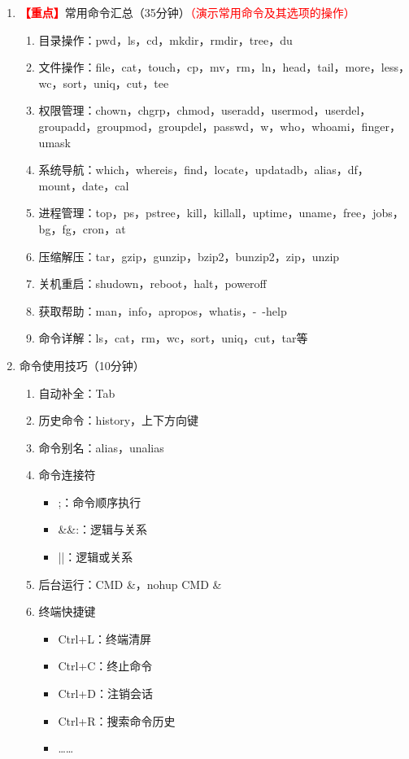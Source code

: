 \documentclass{TIJMUjiaoanLL}
\begin{document}
\begin{enumerate}
  \item \textcolor{red}{\textbf{【重点】}}常用命令汇总（35分钟）\textcolor{red}{（演示常用命令及其选项的操作）}
    \begin{enumerate}
      \item 目录操作：pwd，ls，cd，mkdir，rmdir，tree，du
      \item 文件操作：file，cat，touch，cp，mv，rm，ln，head，tail，more，less，wc，sort，uniq，cut，tee
      \item 权限管理：chown，chgrp，chmod，useradd，usermod，userdel，groupadd，groupmod，groupdel，passwd，w，who，whoami，finger，umask
      \item 系统导航：which，whereis，find，locate，updatadb，alias，df，mount，date，cal
      \item 进程管理：top，ps，pstree，kill，killall，uptime，uname，free，jobs，bg，fg，cron，at
      \item 压缩解压：tar，gzip，gunzip，bzip2，bunzip2，zip，unzip
      \item 关机重启：shudown，reboot，halt，poweroff
      \item 获取帮助：man，info，apropos，whatis，-\ -help
      \item 命令详解：ls，cat，rm，wc，sort，uniq，cut，tar等
    \end{enumerate}

  \item 命令使用技巧（10分钟）
    \vspace*{-10pt}
    \begin{multicols}{2}
    \begin{enumerate}
      \item 自动补全：Tab
      \item 历史命令：history，上下方向键
      \item 命令别名：alias，unalias
      \item 命令连接符
	\begin{itemize}
	  \item ;：命令顺序执行
	  \item \&\&:：逻辑与关系
	  \item ||：逻辑或关系
	\end{itemize}
      \item 后台运行：CMD \&，nohup CMD \&
      \item 终端快捷键
	\begin{itemize}
	  \item Ctrl+L：终端清屏
	  \item Ctrl+C：终止命令
	  \item Ctrl+D：注销会话
	  \item Ctrl+R：搜索命令历史
	  \item ……
	\end{itemize}
    \end{enumerate}
    \end{multicols}
    \vspace*{-10pt}


\end{enumerate}
\end{document}
